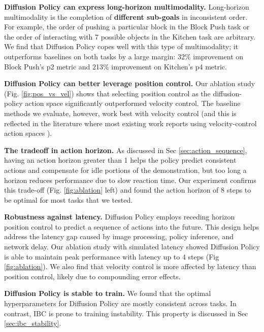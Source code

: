 \documentclass[Afour,sageh,times]{sagej}
\begin{document}
\textbf{Diffusion Policy can express long-horizon multimodality.}
Long-horizon multimodality is the completion of \textbf{different sub-goals} in inconsistent order. For example, the order of pushing a particular block in the Block Push task or the order of interacting with 7 possible objects in the Kitchen task are arbitrary.
We find that Diffusion Policy copes well with this type of multimodality; it outperforms baselines on both tasks by a large margin: 32\% improvement on Block Push's p2 metric and 213\% improvement on Kitchen's p4 metric.

\textbf{Diffusion Policy can better leverage position control.}
\label{sec:eval_pos_vs_vel}
Our ablation study (Fig. \ref{fig:pos_vs_vel}) shows that selecting position control as the diffusion-policy action space significantly outperformed velocity control. The baseline methods we evaluate, however, work best with velocity control (and this is reflected in the literature where most existing work reports using velocity-control action spaces \cite{robomimic, bet, zhang2018deep, florence2019self, mandlekar2020learning, mandlekar2020iris}).



\textbf{The tradeoff in action horizon.}
As discussed in Sec \ref{sec:action_sequence},
having an action horizon greater than 1 helps the policy predict consistent actions and compensate for idle portions of the demonstration, but too long a horizon reduces performance due to slow reaction time. Our experiment confirms this trade-off (Fig. \ref{fig:ablation} left) and found the action horizon of 8 steps to be optimal for most tasks that we tested.

\textbf{Robustness against latency.}
Diffusion Policy employs receding horizon position control to predict a sequence of actions into the future. This design helps address the latency gap caused by image processing, policy inference, and network delay. Our ablation study with simulated latency showed Diffusion Policy is able to maintain peak performance with latency up to 4 steps (Fig \ref{fig:ablation}). We also find that velocity control is more affected by latency than position control, likely due to compounding error effects.



\textbf{Diffusion Policy is stable to train.}
We found that the optimal hyperparameters for Diffusion Policy are mostly consistent across tasks.  In contrast,  IBC \cite{ibc} is prone to training instability. This property is discussed in Sec \ref{sec:ibc_stability}.
\end{document}
